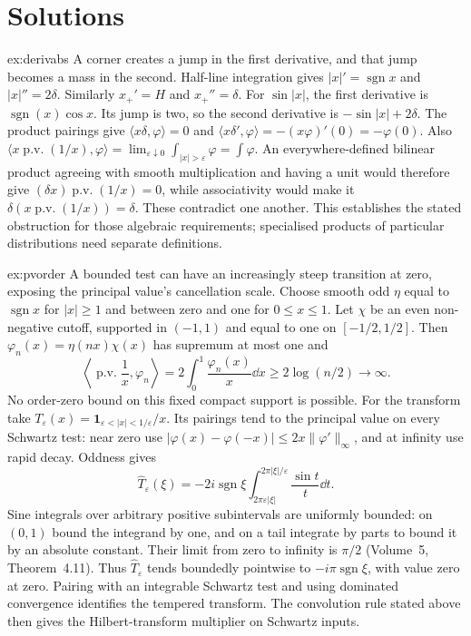\section{Solutions}

\begin{solution}{ex:derivabs}
\idea A corner creates a jump in the first derivative, and that jump becomes a mass in the second.
\writeup Half-line integration gives $|x|'=\operatorname{sgn}x$ and $|x|''=2\delta$. Similarly $x_+'=H$ and $x_+''=\delta$. For $\sin|x|$, the first derivative is $\operatorname{sgn}(x)\cos x$. Its jump is two, so the second derivative is $-\sin|x|+2\delta$.
The product pairings give $\langle x\delta,\varphi\rangle=0$ and $\langle x\delta',\varphi\rangle=-(x\varphi)'(0)=-\varphi(0)$. Also
$\langle x\operatorname{p.v.}(1/x),\varphi\rangle=\lim_{\varepsilon\downarrow0}\int_{|x|>\varepsilon}\varphi=\int\varphi$.
An everywhere-defined bilinear product agreeing with smooth multiplication and having a unit would therefore give $(\delta x)\operatorname{p.v.}(1/x)=0$, while associativity would make it $\delta(x\operatorname{p.v.}(1/x))=\delta$. These contradict one another. This establishes the stated obstruction for those algebraic requirements; specialised products of particular distributions need separate definitions.
\end{solution}

\begin{solution}{ex:pvorder}
\idea A bounded test can have an increasingly steep transition at zero, exposing the principal value's cancellation scale.
\writeup Choose smooth odd $\eta$ equal to $\operatorname{sgn}x$ for $|x|\ge1$ and between zero and one for $0\le x\le1$. Let $\chi$ be an even non-negative cutoff, supported in $(-1,1)$ and equal to one on $[-1/2,1/2]$. Then $\varphi_n(x)=\eta(nx)\chi(x)$ has supremum at most one and
\[
\left\langle\operatorname{p.v.}\frac1x,\varphi_n\right\rangle
=2\int_0^1\frac{\varphi_n(x)}x\dd x
\ge2\log(n/2)\longrightarrow\infty.
\]
No order-zero bound on this fixed compact support is possible.
For the transform take $T_\varepsilon(x)=\mathbf1_{\varepsilon<|x|<1/\varepsilon}/x$. Its pairings tend to the principal value on every Schwartz test: near zero use $|\varphi(x)-\varphi(-x)|\le2x\|\varphi'\|_\infty$, and at infinity use rapid decay. Oddness gives
\[
\hat T_\varepsilon(\xi)=-2i\operatorname{sgn}\xi
\int_{2\pi\varepsilon|\xi|}^{2\pi|\xi|/\varepsilon}\frac{\sin t}t\dd t.
\]
Sine integrals over arbitrary positive subintervals are uniformly bounded: on $(0,1)$ bound the integrand by one, and on a tail integrate by parts to bound it by an absolute constant. Their limit from zero to infinity is $\pi/2$ (Volume~5, Theorem~4.11). Thus $\hat T_\varepsilon$ tends boundedly pointwise to $-i\pi\operatorname{sgn}\xi$, with value zero at zero. Pairing with an integrable Schwartz test and using dominated convergence identifies the tempered transform. The convolution rule stated above then gives the Hilbert-transform multiplier on Schwartz inputs.
\end{solution}

